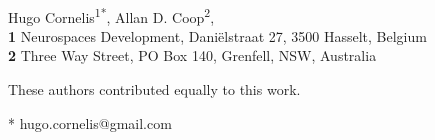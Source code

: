 \documentclass[10pt,letterpaper]{article}
\begin{document}
\vspace*{0.2in}

\begin{flushleft}
{\Large
\textbf{}
}
\newline
\\
Hugo Cornelis\textsuperscript{1*\Yinyang},
Allan D. Coop\textsuperscript{2\Yinyang},
\\
\bigskip
\textbf{1} Neurospaces Development, Daniëlstraat 27, 3500 Hasselt, Belgium
\\
\textbf{2} Three Way Street, PO Box 140, Grenfell, NSW, Australia
\\
\bigskip

% 
%
\Yinyang These authors contributed equally to this work.





* hugo.cornelis@gmail.com
\end{flushleft}
\end{document}
